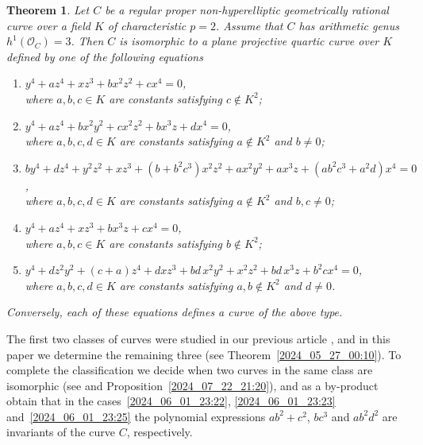 \documentclass[12pt,reqno]{amsart}
\newtheorem{thm}{Theorem}[section]
\theoremstyle{definition}
\newcommand{\OO}{\mathcal{O}}
\begin{document}

\begin{thm} \label{2024_06_01_23:20}
Let $C$ be a regular proper non-hyperelliptic geometrically rational curve over a field $K$ of characteristic $p=2$.
Assume that $C$ has arithmetic genus $h^1(\OO_C)=3$.
Then $C$ is isomorphic to a plane projective quartic curve over $K$ defined by one of the following equations
\begin{enumerate}[\upshape (i)]
    \item \label{2024_06_01_23:21}
    $y^4 + a z^4 + x z^3 + b x^2 z^2 + c x^4 = 0$, \\
    where $a,b,c \in K$ are constants satisfying $c \notin K^2$;
    
    \item \label{2024_06_01_23:22}
    $ y^4 + a z^4 + b x^2 y^2 + c x^2 z^2 + b x^3 z + d x^4 = 0$, \\
    where $a,b,c,d \in K$ are constants satisfying $a\notin K^2$ and $b\neq 0$;
    
    \item \label{2024_06_01_23:23}
    $b y^4 + d z^4 + y^2 z^2 + x z^3 + (b + b^2 c^3) x^2 z^2 + a x^2 y^2 + a x^3 z + (a b^2 c^3 + a^2 d) x^4 = 0$, \\
    where $a,b,c,d\in K$ are constants satisfying $a\notin K^2$ and $b,c\neq0$;
    
    \item \label{2024_06_01_23:24}
    $y^4 + a z^4 + x z^3 + b x^3 z + c x^4 = 0$, \\
    where $a,b,c \in K$ are constants satisfying $b \notin K^2$;

    \item \label{2024_06_01_23:25}
    $ y^4 + d z^2 y^2 + (c+a) z^4 + d x z^3 + bd\, x^2 y^2 + x^2 z^2 + bd\, x^3 z + b^2 c x^4 = 0 $, \\
    where $a,b,c,d\in K$ are constants satisfying $a,b\notin K^2$ and $d\neq 0$.
\end{enumerate}
Conversely, each of these equations defines a curve of the above type.
\end{thm}

The first two classes of curves were studied in our previous article \cite{HiSt23}, and in this paper we determine the remaining three (see Theorem~\ref{2024_05_27_00:10}).
To complete the classification we decide when two curves in the same class are isomorphic
(see \cite[Propositions~3.5 and~4.5]{HiSt23} and Proposition~\ref{2024_07_22_21:20}), 
and as a by-product obtain that in the cases~\ref{2024_06_01_23:22}, \ref{2024_06_01_23:23} and~\ref{2024_06_01_23:25} the polynomial expressions $a b^2 + c^2$, $b c^3$ and $a b^2 d^2$ are invariants of the curve $C$, respectively.
\end{document}
